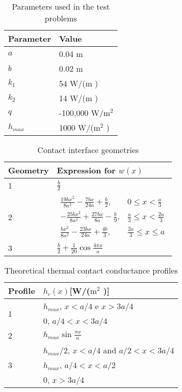 \documentclass[conference,compsoc,fleqn]{IEEEtran}
\begin{document}
\begin{table}[H]
	\centering
	\caption{Parameters used in the test problems}
	\begin{tabular}{|l|l|}
		\hline
		\textbf{Parameter} & \textbf{Value}  \\ \hline
		$a$       & 0.04 m   \\ \hline
		$b$       & 0.02 m     \\ \hline
		$k_1$     & 54 W/(m \celsius)  \\ \hline
		$k_2$     & 14 W/(m \celsius) \\ \hline
		$q$       & -100,000 W/$\text{m}^2$ \\ \hline
		$h_{max}$       & 1000 W/($\text{m}^2$ \celsius) \\ \hline
	\end{tabular}		
	\label{tabela_params}
\end{table}

\begin{table}[H]
	\centering
	\caption{Contact interface geometries}
	\begin{tabular}{|l|l|}
		\hline 
		\textbf{Geometry} & \textbf{Expression for} $w(x)$    \\ \hline
		1       & $\frac{b}{2}$   \\ \hline
		2       & $\begin{array}{ll}
		\frac{19bx^2}{8a^2}-\frac{7bx}{24a}+\frac{b}{2}, &  0 \le x < \frac{a}{3} \\
		 -\frac{25bx^2}{8a^2}+\frac{27bx}{8a}-\frac{b}{9}, &  \frac{a}{3} \le x < \frac{2a}{3} \\ 
		 \frac{bx^2}{8a^2}-\frac{23bx}{24a}+\frac{4b}{3}, &  \frac{2a}{3} \le x \le a
		\end{array}$     \\ \hline
		3       & $ \frac{b}{2} + \frac{1}{20} \cos\frac{4 \pi  x}{a}$ \\ \hline
	\end{tabular}			
	\label{tabela_interfaces}
\end{table}

\begin{table}[H]
	\centering
	\caption{Theoretical thermal contact conductance profiles}
	\begin{tabular}{|l|l|}
		\hline
		\textbf{Profile} & $h_c(x)$[W/($\text{m}^2$ \celsius)]  \\ \hline
		\multirow{2}{*}{1} & $h_{max}$, $x < a/4$ e $x > 3a/4$ \\ & 0, $a/4 < x < 3a/4$ \\ \hline
		2 & $h_{max}\sin\frac{\pi x}{a}$ \\ \hline
		\multirow{3}{*}{3} & $h_{max}/2$, $x < a/4$ and $a/2 < x < 3a/4$ \\ & $h_{max}$, $a/4 < x < a/2$ \\ & 0, $ x > 3a/4$
		\\ \hline
	\end{tabular}			
	\label{tabela_ctc}
\end{table}
\end{document}
